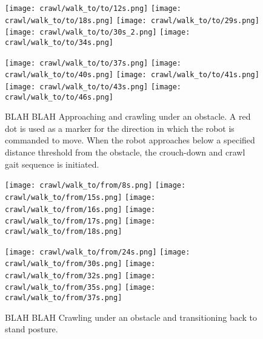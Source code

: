 \begin{figure}
  \centerline{
    \texttt{[image: crawl/walk\_to/to/12s.png]}
    \texttt{[image: crawl/walk\_to/to/18s.png]}
    \texttt{[image: crawl/walk\_to/to/29s.png]}
    \texttt{[image: crawl/walk\_to/to/30s\_2.png]}
    \texttt{[image: crawl/walk\_to/to/34s.png]}
  }
  \vspace*{0.05in}
  \centerline{
    \texttt{[image: crawl/walk\_to/to/37s.png]}
    \texttt{[image: crawl/walk\_to/to/40s.png]}
    \texttt{[image: crawl/walk\_to/to/41s.png]}
    \texttt{[image: crawl/walk\_to/to/43s.png]}
    \texttt{[image: crawl/walk\_to/to/46s.png]}
  }
  \vspace*{-0.05in}
  \caption{BLAH BLAH Approaching and crawling under an obstacle.
           A red dot is used as a marker for the direction in which the robot is commanded to move.
           When the robot approaches below a specified distance threshold from the obstacle,
           the crouch-down and crawl gait sequence is initiated.}
  \label{fig:nao_crawl3}
  \vspace*{-0.15in}
\end{figure}

\begin{figure}
  \centerline{
    \texttt{[image: crawl/walk\_to/from/8s.png]}
    \texttt{[image: crawl/walk\_to/from/15s.png]}
    \texttt{[image: crawl/walk\_to/from/16s.png]}
    \texttt{[image: crawl/walk\_to/from/17s.png]}
    \texttt{[image: crawl/walk\_to/from/18s.png]}
  }
  \vspace*{0.05in}
  \centerline{
    \texttt{[image: crawl/walk\_to/from/24s.png]}
    \texttt{[image: crawl/walk\_to/from/30s.png]}
    \texttt{[image: crawl/walk\_to/from/32s.png]}
    \texttt{[image: crawl/walk\_to/from/35s.png]}
    \texttt{[image: crawl/walk\_to/from/37s.png]}
  }
  \vspace*{-0.05in}
  \caption{BLAH BLAH Crawling under an obstacle and transitioning back to stand posture.}
  \label{fig:nao_crawl4}
  \vspace*{-0.01in}
  \vspace*{-0.05in}
\end{figure}

